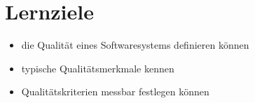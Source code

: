 \section{Lernziele}

\begin{itemize}
    \item die Qualität eines Softwaresystems definieren können
    \item typische Qualitätsmerkmale kennen
    \item Qualitätskriterien messbar festlegen können
\end{itemize}
